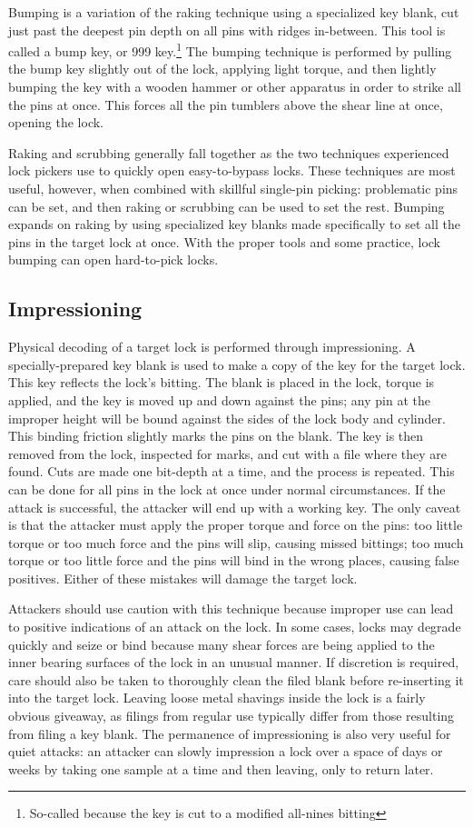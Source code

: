 \documentclass{acm_proc_article-sp}
\begin{document}
Bumping is a variation of the raking technique using a specialized key blank, cut just past the deepest pin depth on all pins with ridges in-between. This tool is called a bump key, or 999 key.\footnote{So-called because the key is cut to a modified all-nines bitting} The bumping technique is performed by pulling the bump key slightly out of the lock, applying light torque, and then lightly bumping the key with a wooden hammer or other apparatus in order to strike all the pins at once. This forces all the pin tumblers above the shear line at once, opening the lock.

Raking and scrubbing generally fall together as the two techniques experienced lock pickers use to quickly open easy-to-bypass locks. These techniques are most useful, however, when combined with skillful single-pin picking: problematic pins can be set, and then raking or scrubbing can be used to set the rest. Bumping expands on raking by using specialized key blanks made specifically to set all the pins in the target lock at once. With the proper tools and some practice, lock bumping can open hard-to-pick locks.

\subsection{Impressioning}
Physical decoding of a target lock is performed through impressioning. A specially-prepared key blank is used to make a copy of the key for the target lock. This key reflects the lock's bitting. The blank is placed in the lock, torque is applied, and the key is moved up and down against the pins; any pin at the improper height will be bound against the sides of the lock body and cylinder. This binding friction slightly marks the pins on the blank. The key is then removed from the lock, inspected for marks, and cut with a file where they are found. Cuts are made one bit-depth at a time, and the process is repeated. This can be done for all pins in the lock at once under normal circumstances. If the attack is successful, the attacker will end up with a working key. The only caveat is that the attacker must apply the proper torque and force on the pins: too little torque or too much force and the pins will slip, causing missed bittings; too much torque or too little force and the pins will bind in the wrong places, causing false positives. Either of these mistakes will damage the target lock.

Attackers should use caution with this technique because improper use can lead to positive indications of an attack on the lock. In some cases, locks may degrade quickly and seize or bind because many shear forces are being applied to the inner bearing surfaces of the lock in an unusual manner. If discretion is required, care should also be taken to thoroughly clean the filed blank before re-inserting it into the target lock. Leaving loose metal shavings inside the lock is a fairly obvious giveaway, as filings from regular use typically differ from those resulting from filing a key blank. The permanence of impressioning is also very useful for quiet attacks: an attacker can slowly impression a lock over a space of days or weeks by taking one sample at a time and then leaving, only to return later.
\end{document}
